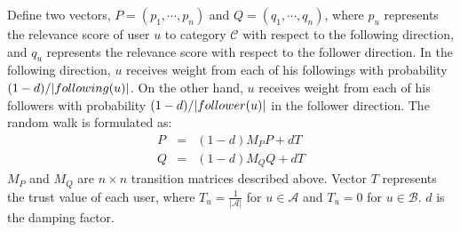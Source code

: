 \documentclass{article}
\begin{document}


Define two vectors, $P = (p_1, \cdots, p_n)$ and $Q = (q_1, \cdots, q_n)$, where $p_u$ represents the relevance score of user $u$ to category $\mathcal{C}$ with respect to the following direction, and $q_u$ represents the relevance score with respect to the follower direction.
In the following direction, $u$ receives weight from each of his followings with probability $(1 - d) / |following(u)|$. On the other hand, $u$ receives weight from each of his followers with probability $(1 - d) / |follower(u)|$ in the follower direction. The random walk is formulated as:
\begin{eqnarray}\label{eq:randomwalk}
P & = & (1 - d) M_P P + d T \nonumber \\
Q & = & (1 - d) M_Q Q + d T
\end{eqnarray}
$M_P$ and $M_Q$ are $n \times n$ transition matrices described above. Vector $T$ represents the trust value of each user, where $T_u = \frac{1}{|\mathcal{A}|}$ for $u \in \mathcal{A}$ and $T_u = 0$ for $u \in \mathcal{B}$. $d$ is the damping factor.
\end{document}
